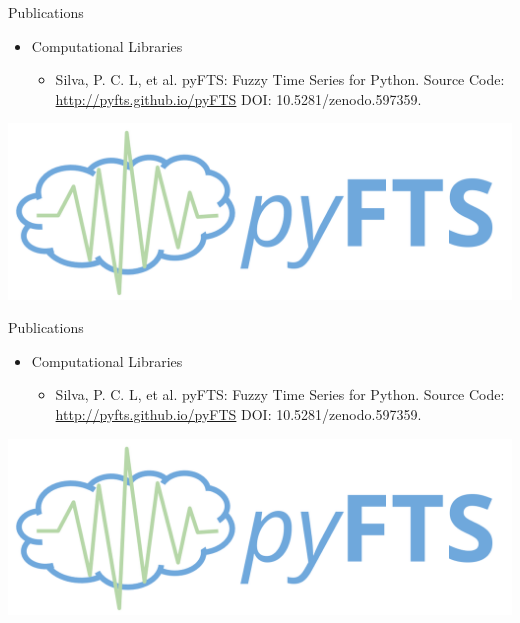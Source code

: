 \documentclass{beamer}
\begin{document}
\begin{frame}{Publications}
\begin{itemize}
    \item Computational Libraries
    \begin{itemize}
    \item Silva, P. C. L, et al. pyFTS: Fuzzy Time Series for Python. Source Code: \url{http://pyfts.github.io/pyFTS} DOI: 10.5281/zenodo.597359.
    \end{itemize}
\end{itemize}

\includegraphics[width=\textwidth]{figures/pyfts_logo.png}

\end{frame}

\begin{frame}{Publications}
\begin{itemize}
    \item Computational Libraries
    \begin{itemize}
    \item Silva, P. C. L, et al. pyFTS: Fuzzy Time Series for Python. Source Code: \url{http://pyfts.github.io/pyFTS} DOI: 10.5281/zenodo.597359.
    \end{itemize}
\end{itemize}

\includegraphics[width=\textwidth]{figures/pyfts_logo.png}

\end{frame}
\end{document}
